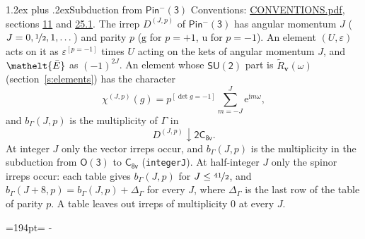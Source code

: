 \documentclass[10pt,a4paper]{article}
\makeatletter
\renewcommand\section{\@startsection{section}{1}{\z@}{-3ex plus -1ex minus -.2ex}%
  {1.2ex plus .2ex}{\normalfont\large\sffamily\bfseries\color{parttitle}}}
\newcommand{\needspace}[1]{\par\penalty-100\begingroup\dimen0=#1\relax\dimen2=\pagegoal
  \advance\dimen2-\pagetotal\ifdim\dimen0>\dimen2\relax\ifdim\dimen2>0pt\vfil\break\fi\fi
  \endgroup}
\numberwithin{equation}{section}
\newcommand{\eltfont}[1]{{\let\sigma\eltsigma\mathelt{#1}}}
\newcommand{\grp}[1]{\mathsf{#1}}
\newcommand{\elt}[1]{\eltfont{#1}}
\newcommand{\ptag}[1]{\mathrm{#1}}
\newcommand{\iverson}[1]{[#1]}
\newcommand{\restr}[2]{#1\!\downarrow#2}
\newcommand{\vv}{\mathbf{v}}
\newcommand{\iunit}{\mathrm{i}}
\newcommand{\expe}{\mathrm{e}}
\newcommand{\irrJp}[2]{D^{(#1,#2)}}
\newcommand{\barred}[1]{\bar{#1}}
\newcommand{\lift}[1]{\tilde{#1}}
\makeatother
\begin{document}
\section{Subduction from \texorpdfstring{$\grp{Pin^{-}(3)}$}{Pin(3)}}\label{s:subduction_parent}
Conventions: \href{../../CONVENTIONS.pdf}{CONVENTIONS.pdf}, sections \href{../../../rotation/CONVENTIONS.pdf\#conv.11}{11} and \href{../../CONVENTIONS.pdf\#conv.25.1}{25.1}.
\leavevmode\label{n:index.J}\label{n:index.parity}\label{n:irrep.o3}The irrep $\irrJp{J}{p}$ of \href{Pinminus3.pdf}{$\grp{Pin^{-}(3)}$} has angular momentum $J$ ($J = 0, \nicefrac{1}{2}, 1, \dots$) and parity $p$ ($\ptag{g}$ for $p = +1$, $\ptag{u}$ for $p = -1$). An element $(U, \varepsilon)$ acts on it as $\varepsilon^{[p = -1]}$ times $U$ acting on the kets of angular momentum $J$, and $\elt{\barred{E}}$ as $(-1)^{2J}$. \label{n:function.character.parent}\label{n:function.multiplicity}An element whose $\grp{SU(2)}$ part is $\lift{R}_{\vv}(\omega)$ (section~\ref{s:elements}) has the character
\begin{equation}\label{e:chi}\chi^{(J,p)}(g) = p^{\iverson{\det g = -1}}\sum_{m=-J}^{J} \expe^{\iunit m\omega},\end{equation}
and $b_\Gamma(J, p)$ is the multiplicity of $\Gamma$ in
\begin{equation}\label{e:parent}\restr{\irrJp{J}{p}}{\grp{2C_{8v}}}.\end{equation}
At integer $J$ only the vector irreps occur, and $b_\Gamma(J, p)$ is the multiplicity in the subduction from $\grp{O(3)}$ to \href{../../../rotation/data/pdf/C8v.pdf}{$\grp{C_{8v}}$} (\texttt{integerJ}). \label{n:index.increment}At half-integer $J$ only the spinor irreps occur: each table gives $b_\Gamma(J, p)$ for $J \le \nicefrac{41}{2}$, and $b_\Gamma(J + 8, p) = b_\Gamma(J, p) + \Delta_\Gamma$ for every $J$, where $\Delta_\Gamma$ is the last row of the table of parity $p$. A table leaves out irreps of multiplicity 0 at every $J$.
\needspace{194pt}
\end{document}
